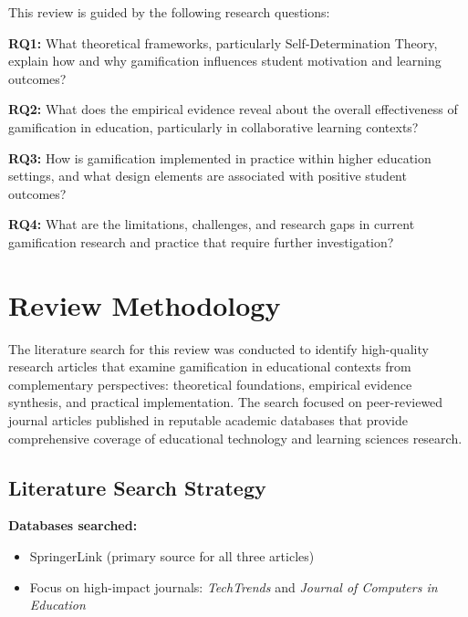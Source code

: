 \documentclass[12pt,a4paper]{article}
\begin{document}
\begin{justify}
This review is guided by the following research questions:

\vspace{0.2cm}

\textbf{RQ1:} What theoretical frameworks, particularly Self-Determination Theory, explain how and why gamification influences student motivation and learning outcomes?

\vspace{0.2cm}

\textbf{RQ2:} What does the empirical evidence reveal about the overall effectiveness of gamification in education, particularly in collaborative learning contexts?

\vspace{0.2cm}

\textbf{RQ3:} How is gamification implemented in practice within higher education settings, and what design elements are associated with positive student outcomes?

\vspace{0.2cm}

\textbf{RQ4:} What are the limitations, challenges, and research gaps in current gamification research and practice that require further investigation?



\section{Review Methodology}

The literature search for this review was conducted to identify high-quality research articles that examine gamification in educational contexts from complementary perspectives: theoretical foundations, empirical evidence synthesis, and practical implementation. The search focused on peer-reviewed journal articles published in reputable academic databases that provide comprehensive coverage of educational technology and learning sciences research.


\subsection{Literature Search Strategy}

\textbf{Databases searched:}

\begin{itemize}
    \item SpringerLink (primary source for all three articles)
    \item Focus on high-impact journals: \textit{TechTrends} and \textit{Journal of Computers in Education}
\end{itemize}


\end{justify}
\end{document}
